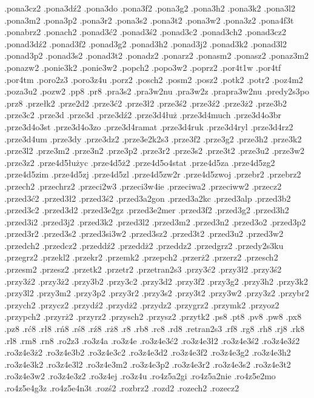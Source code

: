 {.pona3cz2
.pona3d\'z2
.pona3do
.pona3f2
.pona3g2
.pona3h2
.pona3k2
.pona3l2
.pona3m2
.pona3p2
.pona3r2
.pona3s2
.pona3t2
.pona3w2
.pona3z2
.pona4f3t
.ponabrz2
.ponach2
.ponad3\'c2
.ponad3\'s2
.ponad3c2
.ponad3ch2
.ponad3cz2
.ponad3d\'z2
.ponad3f2
.ponad3g2
.ponad3h2
.ponad3j2
.ponad3k2
.ponad3l2
.ponad3p2
.ponad3s2
.ponad3t2
.ponadz2
.ponarz2
.ponasm2
.ponasz2
.ponaz3m2
.ponazw2
.ponie3k2
.ponie3w2
.popch2
.popo3w2
.poprz2
.por4t1w
.por4tf
.por4tm
.poro2z3
.poro3z4u
.porz2
.posch2
.posm2
.posz2
.potk2
.potr2
.poz4m2
.poza3u2
.pozw2
.pp8
.pr8
.pra3s2
.pra3w2nu
.pra3w2z
.prapra3w2nu
.predy2s3po
.prz8
.prze\l k2
.prze2d2
.prze3\'c2
.prze3\l 2
.prze3\'s2
.prze3\'z2
.prze3\.z2
.prze3b2
.prze3c2
.prze3d\ka
.prze3d\ke
.prze3d\'z2
.prze3d4\l u\.z
.prze3d4much
.prze3d4o3br
.prze3d4o3st
.prze3d4o3zo
.prze3d4ramat
.prze3d4ruk
.prze3d4ryl
.prze3d4rz2
.prze3d4um
.prze3dy
.prze3dz2
.prze3e2k2s3
.prze3f2
.prze3g2
.prze3h2
.prze3k2
.prze3l2
.prze3m2
.prze3n2
.prze3p2
.prze3r2
.prze3s2
.prze3t2
.prze3u2
.prze3w2
.prze3z2
.prze4d5\l u\.zyc
.prze4d5\.z2
.prze4d5o4stat
.prze4d5za
.prze4d5zg2
.prze4d5zim
.prze4d5zj
.prze4d5zl
.prze4d5zw2r
.prze4d5zwoj
.przebr2
.przebrz2
.przech2
.przechrz2
.przeci2w3
.przeci3w4ie
.przeciwa2
.przeciww2
.przecz2
.przed3\'c2
.przed3\l 2
.przed3\'s2
.przed3a2gon
.przed3a2kc
.przed3alp
.przed3b2
.przed3c2
.przed3d2
.przed3e2gz
.przed3e2mer
.przed3f2
.przed3g2
.przed3h2
.przed3i2
.przed3j2
.przed3k2
.przed3l2
.przed3m2
.przed3n2
.przed3o2
.przed3p2
.przed3r2
.przed3s2
.przed3si\ke3w2
.przed3sz2
.przed3t2
.przed3u2
.przed3w2
.przedch2
.przedcz2
.przedd\'z2
.przedd\.z2
.przeddz2
.przedgrz2
.przedy2s3ku
.przegrz2
.przekl2
.przekr2
.przemk2
.przepch2
.przer\.z2
.przerz2
.przesch2
.przesm2
.przesz2
.przetk2
.przetr2
.przetran2s3
.przy3\'c2
.przy3\l 2
.przy3\'s2
.przy3\'z2
.przy3\.z2
.przy3b2
.przy3c2
.przy3d2
.przy3f2
.przy3g2
.przy3h2
.przy3k2
.przy3l2
.przy3m2
.przy3p2
.przy3r2
.przy3s2
.przy3t2
.przy3w2
.przy3z2
.przybr2
.przych2
.przycz2
.przyd\'z2
.przyd\.z2
.przydz2
.przygrz2
.przymk2
.przyoz2
.przypch2
.przyr\.z2
.przyrz2
.przysch2
.przysz2
.przytk2
.ps8
.pt8
.pv8
.pw8
.px8
.pz8
.r\'c8
.r\l 8
.r\'n8
.r\'s8
.r\'z8
.r\.z8
.r8
.rb8
.rc8
.rd8
.retran2s3
.rf8
.rg8
.rh8
.rj8
.rk8
.rl8
.rm8
.rn8
.ro2z3
.ro3z4a
.ro3z4e
.ro3z4e3\'c2
.ro3z4e3\l 2
.ro3z4e3\'s2
.ro3z4e3\'z2
.ro3z4e3\.z2
.ro3z4e3b2
.ro3z4e3c2
.ro3z4e3d2
.ro3z4e3f2
.ro3z4e3g2
.ro3z4e3h2
.ro3z4e3k2
.ro3z4e3l2
.ro3z4e3m2
.ro3z4e3p2
.ro3z4e3r2
.ro3z4e3s2
.ro3z4e3t2
.ro3z4e3w2
.ro3z4e3z2
.ro3z4ej
.ro3z4u
.ro4z5a2gi
.ro4z5a2nie
.ro4z5e2mo
.ro4z5e4g3z
.ro4z5e4n3t
.roz\'s2
.rozbrz2
.rozd2
.rozech2
.rozecz2
}
